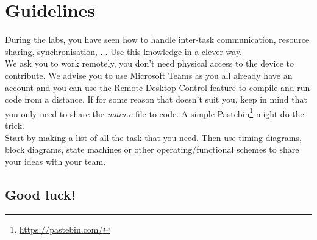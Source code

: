 \section*{Guidelines}

During the labs, you have seen how to handle inter-task communication, resource sharing, synchronisation, ...
Use this knowledge in a clever way.\\

We ask you to work remotely, you don't need physical access to the device to contribute.
We advise you to use Microsoft Teams as you all already have an account and you can use the Remote Desktop Control feature to compile and run code from a distance.
If for some reason that doesn't suit you, keep in mind that you only need to share the \textit{main.c} file to code.
A simple Pastebin\footnote{\url{https://pastebin.com/}} might do the trick. \\

Start by making a list of all the task that you need.
Then use timing diagrams, block diagrams, state machines or other operating/functional schemes to share your ideas with your team.

\begin{flushright}
\section*{Good luck!}
\end{flushright}
